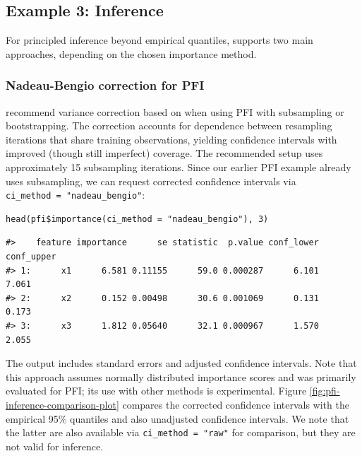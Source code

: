 \subsection{Example 3: Inference}\label{example-3-inference}

For principled inference beyond empirical quantiles,  supports two main approaches, depending on the chosen importance method.

\subsubsection{Nadeau-Bengio correction for PFI}\label{nadeau-bengio-correction-for-pfi}

\citet{molnar2023relatingpartialc} recommend variance correction based on \citet{nadeau2003inferencegeneralization} when using PFI with subsampling or bootstrapping.
The correction accounts for dependence between resampling iterations that share training observations, yielding confidence intervals with improved (though still imperfect) coverage.
The recommended setup uses approximately 15 subsampling iterations.
Since our earlier PFI example already uses subsampling, we can request corrected confidence intervals via \texttt{ci\_method\ =\ "nadeau\_bengio"}:

\begin{verbatim}
head(pfi$importance(ci_method = "nadeau_bengio"), 3)
\end{verbatim}

\begin{verbatim}
#>    feature importance      se statistic  p.value conf_lower conf_upper
#> 1:      x1      6.581 0.11155      59.0 0.000287      6.101      7.061
#> 2:      x2      0.152 0.00498      30.6 0.001069      0.131      0.173
#> 3:      x3      1.812 0.05640      32.1 0.000967      1.570      2.055
\end{verbatim}

The output includes standard errors and adjusted confidence intervals.
Note that this approach assumes normally distributed importance scores and was primarily evaluated for PFI; its use with other methods is experimental.
Figure \ref{fig:pfi-inference-comparison-plot} compares the corrected confidence intervals with the empirical 95\% quantiles and also unadjusted confidence intervals.
We note that the latter are also available via \texttt{ci\_method\ =\ "raw"} for comparison, but they are not valid for inference.

